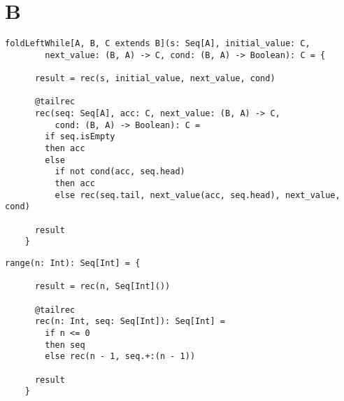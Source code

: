 \documentclass[12pt,a4paper]{book}
\begin{document}
    \chapter{B}

    \begin{lstlisting}[label={lst:foldLeftWhile}]
    foldLeftWhile[A, B, C extends B](s: Seq[A], initial_value: C,
        next_value: (B, A) -> C, cond: (B, A) -> Boolean): C = {

      result = rec(s, initial_value, next_value, cond)

      @tailrec
      rec(seq: Seq[A], acc: C, next_value: (B, A) -> C,
          cond: (B, A) -> Boolean): C =
        if seq.isEmpty
        then acc
        else
          if not cond(acc, seq.head)
          then acc
          else rec(seq.tail, next_value(acc, seq.head), next_value, cond)

      result
    }
    \end{lstlisting}

    \begin{lstlisting}[label={lst:range}]
    range(n: Int): Seq[Int] = {

      result = rec(n, Seq[Int]())

      @tailrec
      rec(n: Int, seq: Seq[Int]): Seq[Int] =
        if n <= 0
        then seq
        else rec(n - 1, seq.+:(n - 1))

      result
    }
    \end{lstlisting}
\end{document}
